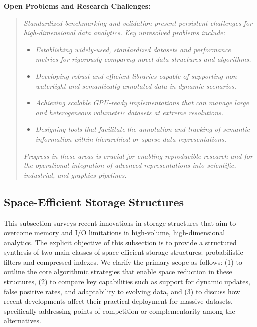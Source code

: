 \documentclass[sigconf]{acmart}
\begin{document}
\textbf{Open Problems and Research Challenges:}
\begin{quote}
\textit{Standardized benchmarking and validation present persistent challenges for high-dimensional data analytics. Key unresolved problems include:}
\begin{itemize}
    \item \textit{Establishing widely-used, standardized datasets and performance metrics for rigorously comparing novel data structures and algorithms.}
    \item \textit{Developing robust and efficient libraries capable of supporting non-watertight and semantically annotated data in dynamic scenarios.}
    \item \textit{Achieving scalable GPU-ready implementations that can manage large and heterogeneous volumetric datasets at extreme resolutions.}
    \item \textit{Designing tools that facilitate the annotation and tracking of semantic information within hierarchical or sparse data representations.}
\end{itemize}
\textit{Progress in these areas is crucial for enabling reproducible research and for the operational integration of advanced representations into scientific, industrial, and graphics pipelines.}
\end{quote}

\subsection{Space-Efficient Storage Structures}

This subsection surveys recent innovations in storage structures that aim to overcome memory and I/O limitations in high-volume, high-dimensional analytics. The explicit objective of this subsection is to provide a structured synthesis of two main classes of space-efficient storage structures: probabilistic filters and compressed indexes. We clarify the primary scope as follows: (1) to outline the core algorithmic strategies that enable space reduction in these structures, (2) to compare key capabilities such as support for dynamic updates, false positive rates, and adaptability to evolving data, and (3) to discuss how recent developments affect their practical deployment for massive datasets, specifically addressing points of competition or complementarity among the alternatives.
\end{document}
